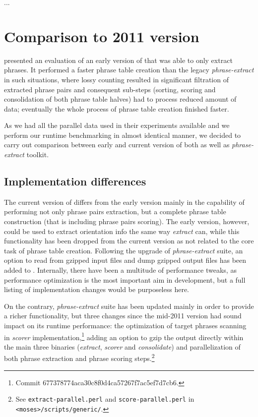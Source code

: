 ...


\section{Comparison to 2011 version}
\label{sec:cu-bojar-results}

\citet{przywara:eppex} presented an evaluation of an early version of \eppex{}
that was able to only extract phrases. It performed a faster phrase
table creation than the legacy \emph{phrase-extract} in such situations,
where lossy counting resulted in significant filtration of extracted phrase
pairs and consequent sub-steps (sorting, scoring and consolidation of both
phrase table halves) had to process reduced amount of data;
eventually the whole process of phrase table creation finished faster.

As we had all the parallel data used in their experiments available and
we perform our runtime benchmarking in almost identical manner,
we decided to carry out comparison between early and current version of
both \eppex{} as well as \emph{phrase-extract} toolkit.

\subsection{Implementation differences}

The current version of \eppex{} differs from the early version mainly in the
capability of performing not only phrase pairs extraction, but a complete
phrase table construction (that is including phrase pairs scoring).
The early version, however, could be used to extract orientation info
the same way \emph{extract} can, while this functionality has been dropped
from the current version as not related to the core task of phrase table creation.
Following the upgrade of \emph{phrase-extract} suite, an option to read from
gzipped input files and dump gzipped output files has been added to \eppex{}.
Internally, there have been a multitude of performance tweaks,
as performance optimization is the most important aim in \eppex{} development,
but a full listing of implementation changes would be purposeless here.

On the contrary, \emph{phrase-extract} suite has been updated mainly in order to
provide a richer functionality, but three changes since the mid-2011 version
had sound impact on its runtime performance: the optimization of target phrases
scanning in \emph{scorer} implementation,\footnote{Commit 677378774aca30c8f0d4ca57267f7ac5ef7d7cb6.}
adding an option to gzip the output directly within the main three binaries
(\emph{extract}, \emph{scorer} and \emph{consolidate})
and parallelization of both phrase extraction and phrase scoring
steps.\footnote{See \texttt{extract-parallel.perl} and \texttt{score-parallel.perl}
in \texttt{<moses>/scripts/generic/}.}

